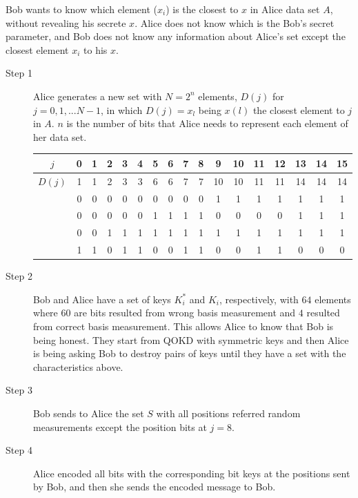 Bob wants to know which element ($x_{i}$) is the closest to $x$ in Alice data set $A$, without revealing his secrete $x$. Alice does not know which is the Bob's secret parameter, and Bob does not know any information about Alice's set except the closest element $x_{i}$ to his $x$.

\begin{description}
  \item[Step 1] Alice generates a new set with $N=2^{n}$ elements, $D(j)$ for $j=0,1,...N-1$, in which $D(j)=x_{l}$ being $x(l)$ the closest element to $j$ in $A$. $n$ is the number of bits that Alice needs to represent each element of her data set.

       \begin{table}[hbt]
        \centering
        \begin{tabular}{c|c|c|c|c|c|c|c|c|c|c|c|c|c|c|c|c}
        \textbf{$j$}    & 0 & 1 & 2 & 3 & 4 & 5 & 6 & 7 & 8 & 9  & 10 & 11 & 12 & 13 & 14 & 15 \\ \hline
        \textbf{$D(j)$} & 1 & 1 & 2 & 3 & 3 & 6 & 6 & 7 & 7 & 10 & 10 & 11 & 11 & 14 & 14 & 14 \\ \hline
                        & 0 & 0 & 0 & 0 & 0 & 0 & 0 & 0 & 0 & 1  & 1  & 1  & 1  & 1  & 1  & 1  \\
                        & 0 & 0 & 0 & 0 & 0 & 1 & 1 & 1 & 1 & 0  & 0  & 0  & 0  & 1  & 1  & 1  \\
                        & 0 & 0 & 1 & 1 & 1 & 1 & 1 & 1 & 1 & 1  & 1  & 1  & 1  & 1  & 1  & 1  \\
                        & 1 & 1 & 0 & 1 & 1 & 0 & 0 & 1 & 1 & 0  & 0  & 1  & 1  & 0  & 0  & 0
        \end{tabular}
  \end{table}

  \item[Step 2]  Bob and Alice have a set of keys $K_{i}^*$ and $K_{i}$, respectively, with $64$ elements where $60$ are bits resulted from wrong basis measurement and $4$ resulted from correct basis measurement. This allows Alice to know that Bob is being honest. They start from QOKD with symmetric keys and then Alice is being asking Bob to destroy pairs of keys until they have a set with the characteristics above.

  \item[Step 3] Bob sends to Alice the set $S$ with all positions referred random measurements except the position bits at $j=8$.

  \item[Step 4] Alice encoded all bits with the corresponding bit keys at the positions sent by Bob, and then she sends the encoded message to Bob.


\end{description}
